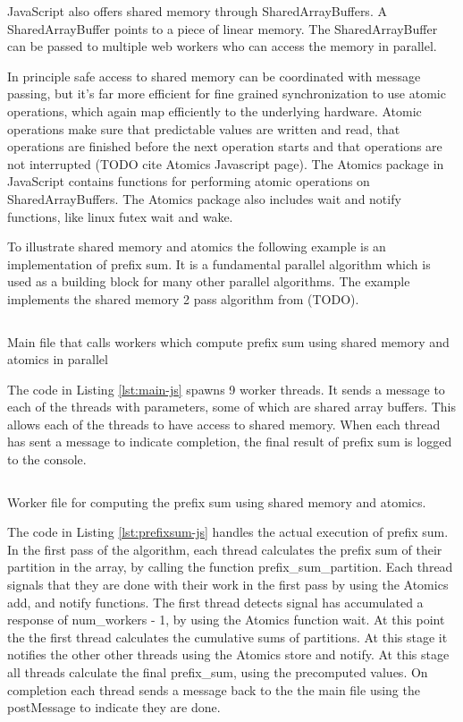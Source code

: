 \documentclass[11pt]{book}
\begin{document}
JavaScript also offers shared memory through SharedArrayBuffers. A SharedArrayBuffer points to a piece of linear memory. The SharedArrayBuffer can be passed to multiple web workers who can access the memory in parallel. 

In principle safe access to shared memory can be coordinated with message passing, but it's far more efficient for fine grained synchronization to use atomic operations, which again map efficiently to the underlying hardware. Atomic operations make sure that predictable values are written and read, that operations are finished before the next operation starts and that operations are not interrupted (TODO cite Atomics Javascript page). The Atomics package in JavaScript contains functions for performing atomic operations on SharedArrayBuffers. The Atomics package also includes wait and notify functions, like linux futex wait and wake.

To illustrate shared memory and atomics the following example is an implementation of prefix sum. It is a fundamental parallel algorithm which is used as a building block for many other parallel algorithms. The example implements the shared memory 2 pass algorithm from (TODO). 
\begin{listing}[H]    
        \inputminted[fontsize=\small,baselinestretch=0.5,linenos]{javascript}{code/shared/main.js}
        \caption{Main file that calls workers which compute prefix sum using shared memory and atomics in parallel}    
        \label{lst:main-js}    
\end{listing}    
The code in Listing \ref{lst:main-js} spawns 9 worker threads. It sends a message to each of the threads with parameters, some of which are shared array buffers. This allows each of the threads to have access to shared memory. When each thread has sent a message to indicate completion, the final result of prefix sum is logged to the console.

\begin{listing}[H]    
\inputminted[fontsize=\small,baselinestretch=0.5,linenos]{javascript}{code/shared/prefix_sum.js}
        \caption{Worker file for computing the prefix sum using shared memory and atomics.}    
        \label{lst:prefixsum-js}    
\end{listing}    


The code in Listing \ref{lst:prefixsum-js} handles the actual execution of prefix sum. In the first pass of the algorithm, each thread calculates the prefix sum of their partition in the array, by calling the function prefix\_sum\_partition. Each thread signals that they are done with their work in the first pass by using the Atomics add, and notify functions. The first thread detects signal has accumulated a response of num\_workers - 1, by using the Atomics function wait. At this point the the first thread calculates the cumulative sums of partitions. At this stage it notifies the other other threads using the Atomics store and notify. At this stage all threads calculate the final prefix\_sum, using the precomputed values. On completion each thread sends a message back to the the main file using the postMessage to indicate they are done. 
\end{document}
